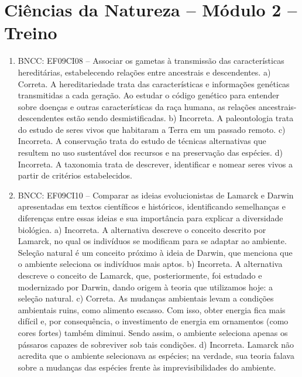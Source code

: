 \section*{Ciências da Natureza – Módulo 2 –  Treino}

\begin{enumerate}
\item
BNCC: EF09CI08 -- Associar os gametas à transmissão
das características hereditárias, estabelecendo relações entre
ancestrais e descendentes.
a) Correta. A hereditariedade trata das características e
  informações genéticas transmitidas a cada geração. Ao estudar o código
  genético para entender sobre doenças e outras características da raça
  humana, as relações ancestrais-descendentes estão sendo desmistificadas.
b) Incorreta. A paleontologia trata do estudo de seres vivos que
  habitaram a Terra em um passado remoto.
c) Incorreta. A conservação trata do estudo de técnicas alternativas
  que resultem no uso sustentável dos recursos e na preservação das
  espécies.
d) Incorreta. A taxonomia trata de descrever, identificar e nomear
  seres vivos a partir de critérios estabelecidos.

\item
BNCC: EF09CI10 -- Comparar as ideias evolucionistas de
Lamarck e Darwin apresentadas em textos científicos e históricos,
identificando semelhanças e diferenças entre essas ideias e sua
importância para explicar a diversidade biológica.
a) Incorreta. A alternativa descreve o conceito descrito por
  Lamarck, no qual os indivíduos se modificam para se adaptar ao
  ambiente. Seleção natural é um conceito próximo à ideia de Darwin, que
  menciona que o ambiente seleciona os indivíduos mais aptos.
b) Incorreta. A alternativa descreve o conceito de Lamarck, que,
  posteriormente, foi estudado e modernizado por Darwin, dando origem à
  teoria que utilizamos hoje: a seleção natural.
c) Correta. As mudanças ambientais levam a condições ambientais
  ruins, como alimento escasso. Com isso, obter energia fica
  mais difícil e, por consequência, o investimento de energia em
  ornamentos (como cores fortes) também diminui. Sendo assim, o ambiente
  seleciona apenas os pássaros capazes de sobreviver sob tais condições.
d) Incorreta. Lamarck não acredita que o ambiente selecionava as
  espécies; na verdade, sua teoria falava sobre a mudanças das espécies
  frente às imprevisibilidades do ambiente.


\end{enumerate}
